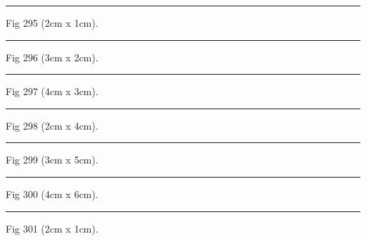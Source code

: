 \documentclass[a4paper,11pt]{article}
\begin{document}
\begin{swarmwrap}%
  \begin{minipage}[t]{2cm}
    \centering
    \rule{\linewidth}{1cm}
    {\footnotesize Fig 295 (2cm x 1cm).}
  \end{minipage}%
\end{swarmwrap}%
\swarmwrapnext
\lipsum[145]%

\begin{swarmwrap}%
  \begin{minipage}[t]{3cm}
    \centering
    \rule{\linewidth}{2cm}
    {\footnotesize Fig 296 (3cm x 2cm).}
  \end{minipage}%
\end{swarmwrap}%
\swarmwrapnext
\lipsum[146]%

\begin{swarmwrap}%
  \begin{minipage}[t]{4cm}
    \centering
    \rule{\linewidth}{3cm}
    {\footnotesize Fig 297 (4cm x 3cm).}
  \end{minipage}%
\end{swarmwrap}%
\swarmwrapnext
\lipsum[147]%

\begin{swarmwrap}%
  \begin{minipage}[t]{2cm}
    \centering
    \rule{\linewidth}{4cm}
    {\footnotesize Fig 298 (2cm x 4cm).}
  \end{minipage}%
\end{swarmwrap}%
\swarmwrapnext
\lipsum[148]%

\begin{swarmwrap}%
  \begin{minipage}[t]{3cm}
    \centering
    \rule{\linewidth}{5cm}
    {\footnotesize Fig 299 (3cm x 5cm).}
  \end{minipage}%
\end{swarmwrap}%
\swarmwrapnext
\lipsum[149]%

\begin{swarmwrap}%
  \begin{minipage}[t]{4cm}
    \centering
    \rule{\linewidth}{6cm}
    {\footnotesize Fig 300 (4cm x 6cm).}
  \end{minipage}%
\end{swarmwrap}%
\swarmwrapnext
\lipsum[150]%

\begin{swarmwrap}%
  \begin{minipage}[t]{2cm}
    \centering
    \rule{\linewidth}{1cm}
    {\footnotesize Fig 301 (2cm x 1cm).}
  \end{minipage}%
\end{swarmwrap}%
\swarmwrapnext
\lipsum[1]%
\end{document}
